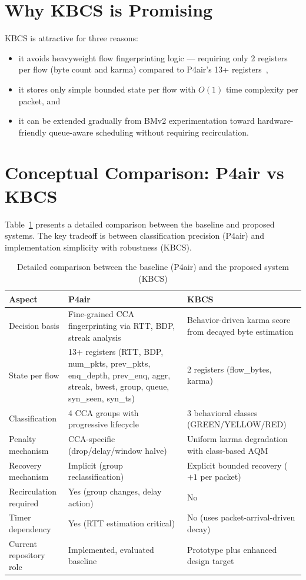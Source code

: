 \documentclass[12pt,a4paper]{report}
\begin{document}
\section{Why KBCS is Promising}
KBCS is attractive for three reasons:
\begin{itemize}
    \item it avoids heavyweight flow fingerprinting logic — requiring only 2 registers per flow (byte count and karma) compared to P4air's 13+ registers~\cite{p4air},
    \item it stores only simple bounded state per flow with $O(1)$ time complexity per packet, and
    \item it can be extended gradually from BMv2 experimentation toward hardware-friendly queue-aware scheduling without requiring recirculation.
\end{itemize}

\section{Conceptual Comparison: P4air vs KBCS}
Table~\ref{tab:p4air_vs_kbcs} presents a detailed comparison between the baseline and proposed systems. The key tradeoff is between classification precision (P4air) and implementation simplicity with robustness (KBCS).

\begin{table}[H]
\centering
\caption{Detailed comparison between the baseline (P4air) and the proposed system (KBCS)}
\label{tab:p4air_vs_kbcs}
\renewcommand{\arraystretch}{1.35}
\begin{tabularx}{\textwidth}{@{}p{3.0cm}p{5.1cm}X@{}}
\toprule
\textbf{Aspect} & \textbf{P4air}~\cite{p4air} & \textbf{KBCS} \\
\midrule
Decision basis & Fine-grained CCA fingerprinting via RTT, BDP, streak analysis & Behavior-driven karma score from decayed byte estimation \\
State per flow & 13+ registers (RTT, BDP, num\_pkts, prev\_pkts, enq\_depth, prev\_enq, aggr, streak, bwest, group, queue, syn\_seen, syn\_ts) & 2 registers (flow\_bytes, karma) \\
Classification & 4 CCA groups with progressive lifecycle & 3 behavioral classes (GREEN/YELLOW/RED) \\
Penalty mechanism & CCA-specific (drop/delay/window halve) & Uniform karma degradation with class-based AQM \\
Recovery mechanism & Implicit (group reclassification) & Explicit bounded recovery ($+1$ per packet) \\
Recirculation required & Yes (group changes, delay action) & No \\
Timer dependency & Yes (RTT estimation critical) & No (uses packet-arrival-driven decay) \\
Current repository role & Implemented, evaluated baseline & Prototype plus enhanced design target \\
\bottomrule
\end{tabularx}
\end{table}
\end{document}
